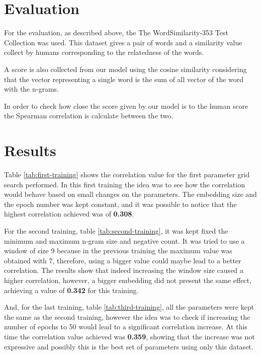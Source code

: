 \documentclass[11pt,oneside,a4paper]{article}
\begin{document}

\section{Evaluation}

For the evaluation, as described above, the The WordSimilarity-353 Test Collection \cite{wordsimilarity} was used. This dataset gives a pair of words and a similarity value collect by humans corresponding to the relatedness of the words.

A score is also collected from our model using the cosine similarity considering that the vector representing a single word is the sum of all vector of the word with the n-grams.

In order to check how close the score given by our model is to the human score the Spearman correlation is calculate between the two.


\section{Results}

Table \ref{tab:first-training} shows the correlation value for the first parameter grid search performed. In this first training the idea was to see how the correlation would behave based on small changes on the parameters. The embedding size and the epoch number was kept constant, and it was possible to notice that the highest correlation achieved was of \textbf{0.308}.

For the second training, table \ref{tab:second-training}, it was kept fixed the minimum and maximum n-gram size and negative count. It was tried to use a window of size 9 because in the previous training the maximum value was obtained with 7, therefore, using a bigger value could maybe lead to a better correlation. The results show that indeed increasing the window size caused a higher correlation, however, a bigger embedding did not present the same effect, achieving a value of \textbf{0.342} for this training.

And, for the last training, table \ref{tab:third-training}, all the parameters were kept the same as the second training, however the idea was to check if increasing the number of epochs to 50 would lead to a significant correlation increase. At this time the correlation value achieved was \textbf{0.359}, showing that the increase was not expressive and possibly this is the best set of parameters using only this dataset.
\end{document}
